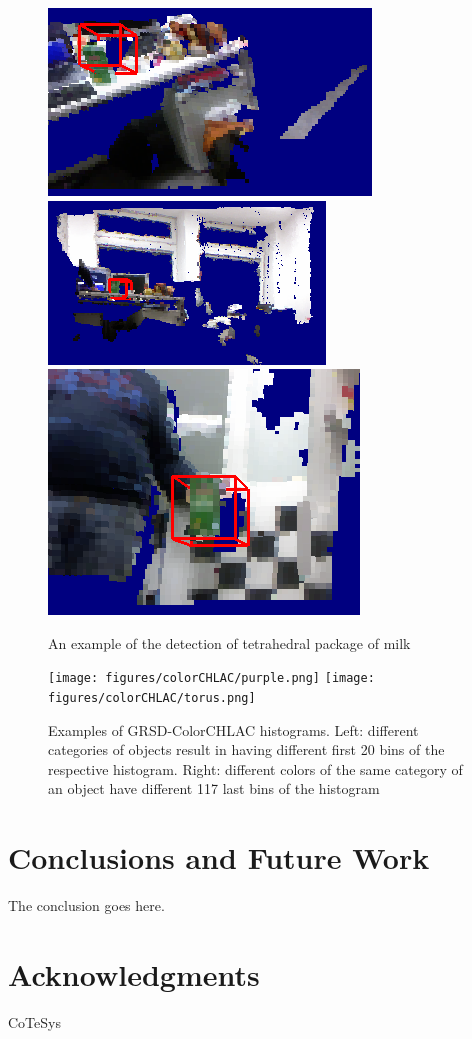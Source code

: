 \documentclass[conference]{sty/IEEEtran}
\begin{document}
\begin{figure}[htb!]
  \begin{center}
    \includegraphics[width=.45\columnwidth]{figures/colorCHLAC/detection7.png}
\hfill
    \includegraphics[width=.45\columnwidth]{figures/colorCHLAC/detection5.png} \\
\hfill
    \includegraphics[width=.9\columnwidth]{figures/colorCHLAC/detection2.png}
\caption{An example of the detection of tetrahedral package of milk}
    \label{fig:milk_testing}
  \end{center}
\end{figure}

\begin{figure}[htb!]
  \begin{center}
    \texttt{[image: figures/colorCHLAC/purple.png]}
    \texttt{[image: figures/colorCHLAC/torus.png]}
    \caption{Examples of GRSD-ColorCHLAC histograms. Left: different categories 
of objects result in having different first 20 bins of the respective histogram.
Right: different colors of the same category of an object have different 117 last bins 
of the histogram}
    \label{fig:grsd_cchlac}
  \end{center}
\end{figure}

\section{Conclusions and Future Work} 
The conclusion goes here.

\section*{Acknowledgments}
CoTeSys



\end{document}
